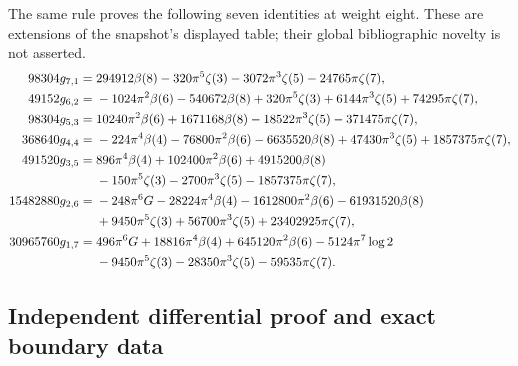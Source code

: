 The same rule proves the following seven identities at weight eight.
These are extensions of the snapshot's displayed table; their global
bibliographic novelty is not asserted.
\begin{align}
 98304g_{7,1}={}&294912\beta(8)-320\pi^5\zeta(3)
                    -3072\pi^3\zeta(5)-24765\pi\zeta(7),\\
 49152g_{6,2}={}&-1024\pi^2\beta(6)-540672\beta(8)
        +320\pi^5\zeta(3)+6144\pi^3\zeta(5)+74295\pi\zeta(7),\\
 98304g_{5,3}={}&10240\pi^2\beta(6)+1671168\beta(8)
                   -18522\pi^3\zeta(5)-371475\pi\zeta(7),\\
 368640g_{4,4}={}&-224\pi^4\beta(4)-76800\pi^2\beta(6)
          -6635520\beta(8)+47430\pi^3\zeta(5)+1857375\pi\zeta(7),\\
 491520g_{3,5}={}&896\pi^4\beta(4)+102400\pi^2\beta(6)
                    +4915200\beta(8)\notag\\
          &-150\pi^5\zeta(3)-2700\pi^3\zeta(5)-1857375\pi\zeta(7),\\
 15482880g_{2,6}={}&-248\pi^6G-28224\pi^4\beta(4)
                  -1612800\pi^2\beta(6)-61931520\beta(8)\notag\\
          &+9450\pi^5\zeta(3)+56700\pi^3\zeta(5)+23402925\pi\zeta(7),\\
 30965760g_{1,7}={}&496\pi^6G+18816\pi^4\beta(4)+645120\pi^2\beta(6)
                    -5124\pi^7\log2\notag\\
          &-9450\pi^5\zeta(3)-28350\pi^3\zeta(5)-59535\pi\zeta(7).
\end{align}

\subsection{Independent differential proof and exact boundary data}

